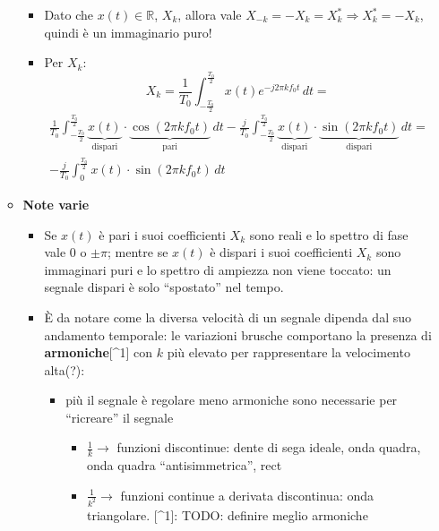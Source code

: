 \documentclass[
  paper=a4,
  ,captions=tableheading
]{scrartcl}
\providecommand{\tightlist}{%
  \setlength{\itemsep}{0pt}\setlength{\parskip}{0pt}}
\begin{document}
\begin{enumerate}
\begin{itemize}
    \begin{itemize}
    \tightlist
    \item
      Dato che \(x(t)\in\mathbb{R}\), \(X_k\), allora vale
      \(X_{-k} = -X_{k} = X_{k}^{*} \Rightarrow X_{k}^{*}=-X_k\), quindi
      è un immaginario puro!
    \item
      Per \(X_k\): \[
        X_k = \frac{1}{T_0}\int_{-\frac{T_0}{2}}^{\frac{T_0}{2}} x(t) e^{-j2\pi kf_{0}t} \,dt =
        \] \begin{gather*}
        \frac{1}{T_0}\int_{-\frac{T_0}{2}}^{\frac{T_0}{2}} \underbrace{x(t)}_{\text{dispari}}\cdot\underbrace{\cos(2\pi kf_{0}t)}_{\text{pari}} \,dt - \frac{j}{T_0}\int_{-\frac{T_0}{2}}^{\frac{T_0}{2}} \underbrace{x(t)}_{\text{dispari}}\cdot\underbrace{\sin(2\pi kf_{0}t)}_{\text{dispari}}\,dt=
        \\
        -\frac{j}{T_0} \int_{0}^{\frac{T_0}{2}} x(t)\cdot\sin{(2\pi kf_{0}t)} \,dt 
        \end{gather*}
    \end{itemize}
  \item
    \textbf{Note varie}

    \begin{itemize}
    \tightlist
    \item
      Se \(x(t)\) è pari i suoi coefficienti \(X_k\) sono reali e lo
      spettro di fase vale \(0\) o \(\pm \pi\); mentre se \(x(t)\) è
      dispari i suoi coefficienti \(X_k\) sono immaginari puri e lo
      spettro di ampiezza non viene toccato: un segnale dispari è solo
      ``spostato'' nel tempo.
    \item
      È da notare come la diversa velocità di un segnale dipenda dal suo
      andamento temporale: le variazioni brusche comportano la presenza
      di \textbf{armoniche}{[}\^{}1{]} con \(k\) più elevato per
      rappresentare la velocimento alta(?):

      \begin{itemize}
      \tightlist
      \item
        più il segnale è regolare meno armoniche sono necessarie per
        ``ricreare'' il segnale

        \begin{itemize}
        \tightlist
        \item
          \(\frac{1}{k} \to\) funzioni discontinue: dente di sega
          ideale, onda quadra, onda quadra ``antisimmetrica'', rect
        \item
          \(\frac{1}{k^2} \to\) funzioni continue a derivata
          discontinua: onda triangolare. {[}\^{}1{]}: TODO: definire
          meglio armoniche
        \end{itemize}
      \end{itemize}
    \end{itemize}
  \end{itemize}
\end{enumerate}
\end{document}
